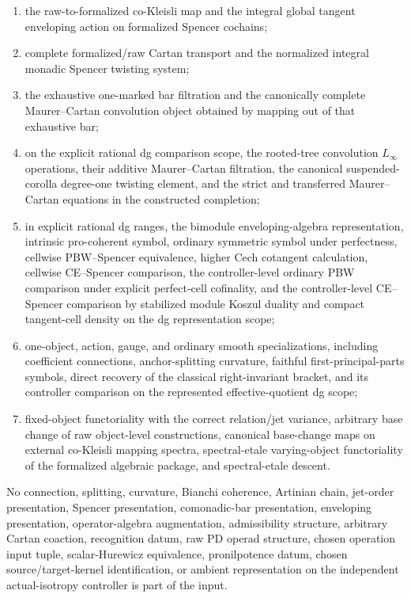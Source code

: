\begin{theorem}
\begin{enumerate}
    \item the raw-to-formalized co-Kleisli map and the integral global tangent
    enveloping action on formalized Spencer cochains;

    \item complete formalized/raw Cartan transport and the normalized integral
    monadic Spencer twisting system;

    \item the exhaustive one-marked bar filtration and the canonically complete
    Maurer--Cartan convolution object obtained by mapping out of that
    exhaustive bar;

    \item on the explicit rational dg comparison scope, the rooted-tree
    convolution $L_\infty$ operations, their additive Maurer--Cartan
    filtration, the canonical suspended-corolla degree-one twisting element,
    and the strict and transferred Maurer--Cartan equations in the constructed
    completion;

    \item in explicit rational dg ranges, the bimodule enveloping-algebra
    representation, intrinsic pro-coherent symbol, ordinary symmetric symbol
    under perfectness, cellwise PBW--Spencer equivalence, higher Cech
    cotangent calculation, cellwise CE--Spencer comparison, the
    controller-level ordinary PBW comparison under explicit perfect-cell
    cofinality, and the controller-level CE--Spencer comparison by stabilized
    module Koszul duality and compact tangent-cell density on the dg
    representation scope;

    \item one-object, action, gauge, and ordinary smooth specializations,
    including coefficient connections, anchor-splitting curvature, faithful
    first-principal-parts symbols, direct recovery of the classical
    right-invariant bracket, and its controller comparison on the represented
    effective-quotient dg scope;

    \item fixed-object functoriality with the correct relation/jet variance,
    arbitrary base change of raw object-level constructions, canonical
    base-change maps on external co-Kleisli mapping spectra, spectral-etale
    varying-object functoriality of the formalized algebraic package, and
    spectral-etale descent.
\end{enumerate}

No connection, splitting, curvature, Bianchi coherence, Artinian chain,
jet-order presentation, Spencer presentation, comonadic-bar presentation,
enveloping presentation, operator-algebra augmentation, admissibility
structure, arbitrary Cartan coaction, recognition datum, raw PD operad
structure, chosen operation input tuple, scalar-Hurewicz equivalence,
pronilpotence datum, chosen source/target-kernel identification, or ambient
representation on the independent actual-isotropy controller is part of the
input.


\end{theorem}
